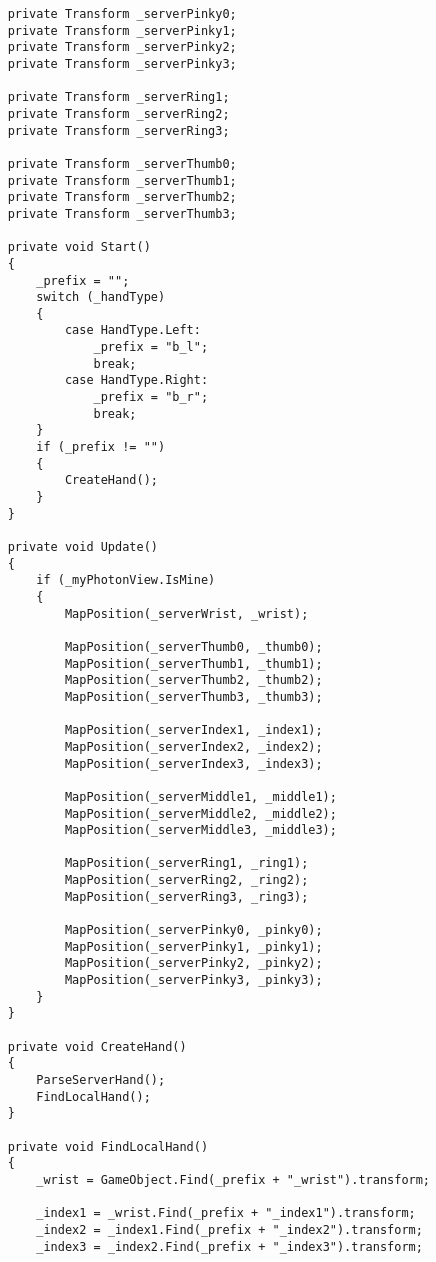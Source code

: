 \begin{verbatim}
    private Transform _serverPinky0;
    private Transform _serverPinky1;
    private Transform _serverPinky2;
    private Transform _serverPinky3;

    private Transform _serverRing1;
    private Transform _serverRing2;
    private Transform _serverRing3;

    private Transform _serverThumb0;
    private Transform _serverThumb1;
    private Transform _serverThumb2;
    private Transform _serverThumb3;

    private void Start()
    {
        _prefix = "";
        switch (_handType)
        {
            case HandType.Left:
                _prefix = "b_l";
                break;
            case HandType.Right:
                _prefix = "b_r";
                break;
        }
        if (_prefix != "")
        {
            CreateHand();
        }
    }

    private void Update()
    {
        if (_myPhotonView.IsMine)
        {
            MapPosition(_serverWrist, _wrist);

            MapPosition(_serverThumb0, _thumb0);
            MapPosition(_serverThumb1, _thumb1);
            MapPosition(_serverThumb2, _thumb2);
            MapPosition(_serverThumb3, _thumb3);

            MapPosition(_serverIndex1, _index1);
            MapPosition(_serverIndex2, _index2);
            MapPosition(_serverIndex3, _index3);

            MapPosition(_serverMiddle1, _middle1);
            MapPosition(_serverMiddle2, _middle2);
            MapPosition(_serverMiddle3, _middle3);

            MapPosition(_serverRing1, _ring1);
            MapPosition(_serverRing2, _ring2);
            MapPosition(_serverRing3, _ring3);

            MapPosition(_serverPinky0, _pinky0);
            MapPosition(_serverPinky1, _pinky1);
            MapPosition(_serverPinky2, _pinky2);
            MapPosition(_serverPinky3, _pinky3);
        }
    }

    private void CreateHand()
    {
        ParseServerHand();
        FindLocalHand();
    }

    private void FindLocalHand()
    {
        _wrist = GameObject.Find(_prefix + "_wrist").transform;

        _index1 = _wrist.Find(_prefix + "_index1").transform;
        _index2 = _index1.Find(_prefix + "_index2").transform;
        _index3 = _index2.Find(_prefix + "_index3").transform;


\end{verbatim}
